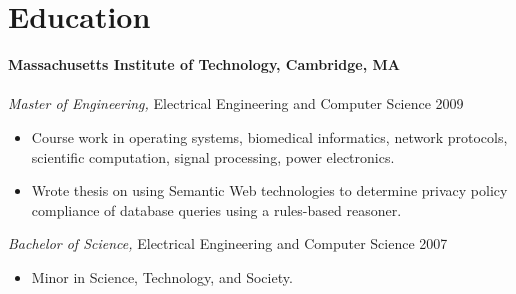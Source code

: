 \section{Education}

\textbf{Massachusetts Institute of Technology, Cambridge, MA} \\
\\
\textit{Master of Engineering,} Electrical Engineering and Computer Science
\hfill 2009
\begin{itemize} \itemsep -2pt %
\item Course work in operating systems, biomedical informatics, network
      protocols, scientific computation, signal processing, power electronics.
\item Wrote thesis on using Semantic Web technologies to determine privacy
      policy compliance of database queries using a rules-based reasoner.
\end{itemize}
\textit{Bachelor of Science,} Electrical Engineering and Computer Science
\hfill 2007
\begin{itemize} \itemsep -2pt %
\item Minor in Science, Technology, and Society.
\end{itemize}

